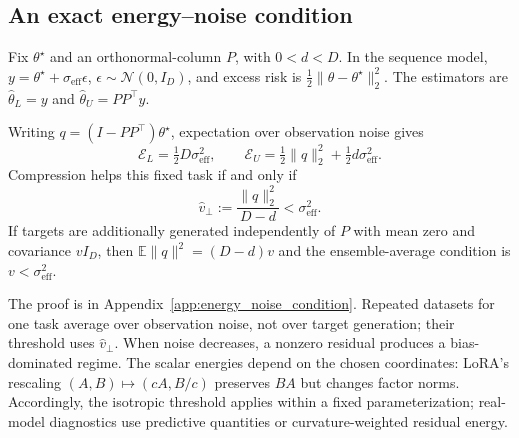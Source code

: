 \subsection{An exact energy--noise condition}
Fix $\theta^\star$ and an orthonormal-column $P$, with $0<d<D$. In the sequence model, $y=\theta^\star+\sigma_{\mathrm{eff}}\epsilon$, $\epsilon\sim\mathcal N(0,I_D)$, and excess risk is $\frac12\|\theta-\theta^\star\|_2^2$. The estimators are $\hat\theta_L=y$ and $\hat\theta_U=PP^\top y$.
\begin{proposition}
\label{prop:energy_noise}
Writing $q=(I-PP^\top)\theta^\star$, expectation over observation noise gives
\begin{equation}
 \mathcal E_L=\tfrac12D\sigma_{\mathrm{eff}}^2,\qquad
 \mathcal E_U=\tfrac12\|q\|_2^2+\tfrac12d\sigma_{\mathrm{eff}}^2.
 \label{main:sequence}
\end{equation}
Compression helps this fixed task if and only if
\begin{equation}
 \hat v_\perp:=\frac{\|q\|_2^2}{D-d}<\sigma_{\mathrm{eff}}^2.
 \label{main:threshold}
\end{equation}
If targets are additionally generated independently of $P$ with mean zero and covariance $vI_D$, then $\mathbb E\|q\|^2=(D-d)v$ and the ensemble-average condition is $v<\sigma_{\mathrm{eff}}^2$.
\end{proposition}
The proof is in Appendix~\ref{app:energy_noise_condition}. Repeated datasets for one task average over observation noise, not over target generation; their threshold uses $\hat v_\perp$. When noise decreases, a nonzero residual produces a bias-dominated regime. The scalar energies depend on the chosen coordinates: LoRA's rescaling $(A,B)\mapsto(cA,B/c)$ preserves $BA$ but changes factor norms. Accordingly, the isotropic threshold applies within a fixed parameterization; real-model diagnostics use predictive quantities or curvature-weighted residual energy.

